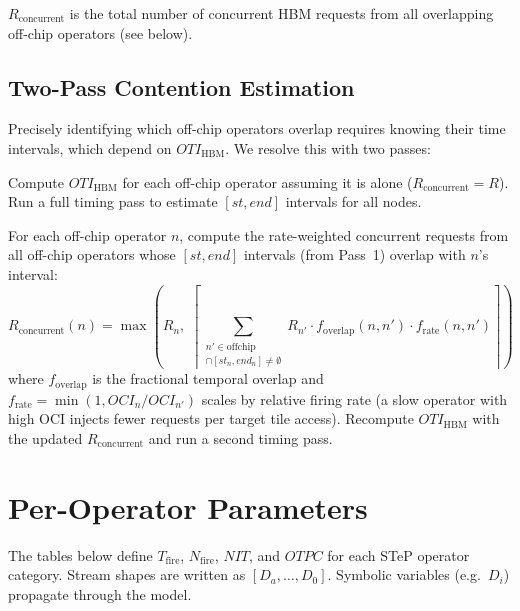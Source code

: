 \documentclass[10pt]{article}
\begin{document}
$R_{\text{concurrent}}$ is the total number of concurrent HBM requests from all overlapping off-chip operators (see below).

\subsection{Two-Pass Contention Estimation}

Precisely identifying which off-chip operators overlap requires knowing their time intervals, which depend on $\mathit{OTI}_{\text{HBM}}$. We resolve this with two passes:

\begin{description}[leftmargin=1.5em, labelindent=0em]
    \item[Pass~1 (no contention).] Compute $\mathit{OTI}_{\text{HBM}}$ for each off-chip operator assuming it is alone ($R_{\text{concurrent}} = R$). Run a full timing pass to estimate $[\mathit{st}, \textit{end}]$ intervals for all nodes.

    \item[Pass~2 (with contention).] For each off-chip operator $n$, compute the rate-weighted concurrent requests from all off-chip operators whose $[\mathit{st}, \textit{end}]$ intervals (from Pass~1) overlap with $n$'s interval:
    \begin{equation}
        R_{\text{concurrent}}(n) = \max\!\left(R_n,\; \left\lceil\sum_{\substack{n' \in \text{offchip} \\ [st_{n'}, end_{n'}] \cap [st_n, end_n] \neq \emptyset}} R_{n'} \cdot f_{\text{overlap}}(n, n') \cdot f_{\text{rate}}(n, n')\right\rceil\right)
    \end{equation}
    where $f_{\text{overlap}}$ is the fractional temporal overlap and $f_{\text{rate}} = \min(1, \mathit{OCI}_n / \mathit{OCI}_{n'})$ scales by relative firing rate (a slow operator with high OCI injects fewer requests per target tile access). Recompute $\mathit{OTI}_{\text{HBM}}$ with the updated $R_{\text{concurrent}}$ and run a second timing pass.
\end{description}

\section{Per-Operator Parameters}

The tables below define $T_{\text{fire}}$, $N_{\text{fire}}$, $\mathit{NIT}$, and $\mathit{OTPC}$ for each STeP operator category. Stream shapes are written as $[D_a, \ldots, D_0]$. Symbolic variables (e.g.\ $D_i$) propagate through the model.
\end{document}

